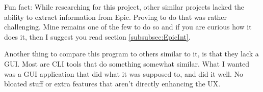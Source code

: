 Fun fact: While researching for this project, other similar
projects lacked the ability to extract information from Epic.
Proving to do that was rather challenging. Mine remains one of the
few to do so and if you are curious how it does it, then I suggest
you read section \ref{subsubsec:EpicInt}.

Another thing to compare this program to others similar to it, is
that they lack a GUI. Most are CLI tools that do something somewhat similar.
What I wanted was a GUI application that did what it was supposed to,
and did it well. No bloated stuff or extra features that aren't
directly enhancing the UX.


